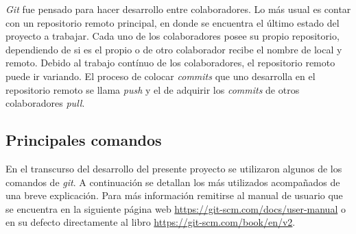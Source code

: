 \textit{Git} fue pensado para hacer desarrollo entre colaboradores. Lo más usual es contar con un repositorio remoto principal, en donde se encuentra el último estado del proyecto a trabajar. Cada uno de los colaboradores posee su propio repositorio, dependiendo de si es el propio o de otro colaborador recibe el nombre de local y remoto. Debido al trabajo contínuo de los colaboradores, el repositorio remoto puede ir variando. El proceso de colocar \textit{commits} que uno desarrolla en el repositorio remoto se llama \textit{push} y el de adquirir los \textit{commits} de otros colaboradores \textit{pull}.

\newpage
\subsection{Principales comandos}

En el transcurso del desarrollo del presente proyecto se utilizaron algunos de los comandos de \textit{git}. A continuación se detallan los más utilizados acompañados de una breve explicación. Para más información remitirse al manual de usuario que se encuentra en la siguiente página web \url{https://git-scm.com/docs/user-manual} o en su defecto directamente al libro \url{https://git-scm.com/book/en/v2}.

